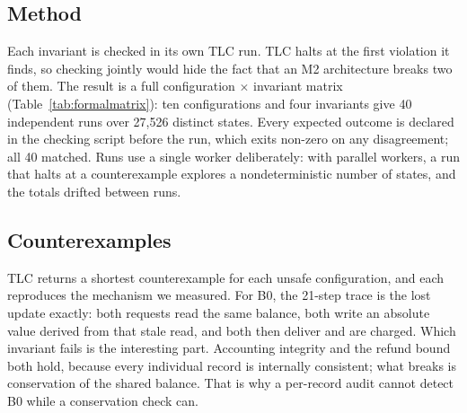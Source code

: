 \documentclass[final,5p,times,twocolumn,number]{elsarticle}
\begin{document}
\subsection{Method}
Each invariant is checked in its own TLC run. TLC halts at the first violation it finds,
so checking jointly would hide the fact that an M2 architecture breaks two of them. The
result is a full configuration $\times$ invariant matrix (Table~\ref{tab:formalmatrix}):
ten configurations and four invariants give 40 independent runs over 27{,}526 distinct
states. Every expected outcome is declared in the checking script before the run, which exits
non-zero on any disagreement; all 40 matched. Runs
use a single worker deliberately: with parallel workers, a run that halts at a
counterexample explores a nondeterministic number of states, and the totals drifted
between runs.

\begin{table}[t]
\centering
\caption{TLC model-checking results across ten architecture configurations and four
invariants. All 40 outcomes matched the expectation declared before the run.}
\label{tab:formalmatrix}
\end{table}

\subsection{Counterexamples}
TLC returns a shortest counterexample for each unsafe configuration, and each reproduces
the mechanism we measured. For B0, the 21-step trace is the lost update exactly: both
requests read the same balance, both write an absolute value derived from that stale
read, and both then deliver and are charged. Which invariant fails is the interesting
part. Accounting integrity and the refund bound both hold, because every individual
record is internally consistent; what breaks is conservation of the shared balance. That
is why a per-record audit cannot detect B0 while a conservation check can.
\end{document}
